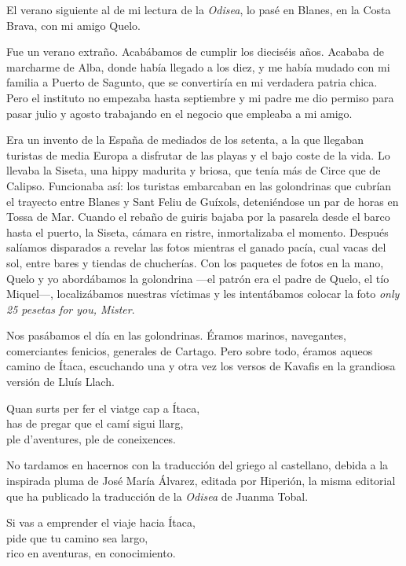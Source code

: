 \label{cap:marcharse}

El verano siguiente al de mi lectura de la \emph{Odisea}, lo pasé en Blanes, en la Costa Brava, con mi amigo Quelo.

Fue un verano extraño. Acabábamos de cumplir los dieciséis años. Acababa de marcharme de Alba, donde había llegado a los diez, y me había mudado con mi familia a Puerto de Sagunto, que se convertiría en mi verdadera patria chica. Pero el instituto no empezaba hasta septiembre y mi padre me dio permiso para pasar julio y agosto trabajando en el negocio que empleaba a mi amigo.

Era un invento de la España de mediados de los setenta, a la que llegaban turistas de media Europa a disfrutar de las playas y el bajo coste de la vida. Lo llevaba la Siseta, una hippy madurita y briosa, que tenía más de Circe que de Calipso. Funcionaba así: los turistas embarcaban en las golondrinas que cubrían el trayecto entre Blanes y Sant Feliu de Guíxols, deteniéndose un par de horas en Tossa de Mar. Cuando el rebaño de guiris bajaba por la pasarela desde el barco hasta el puerto, la Siseta, cámara en ristre, inmortalizaba el momento. Después salíamos disparados a revelar las fotos mientras el ganado pacía, cual vacas del sol, entre bares y tiendas de chucherías. Con los paquetes de fotos en la mano, Quelo y yo abordábamos la golondrina ---el patrón era el padre de Quelo, el tío Miquel---, localizábamos nuestras víctimas y les intentábamos colocar la foto \emph{only 25 pesetas for you, Mister}.

Nos pasábamos el día en las golondrinas. Éramos marinos, navegantes, comerciantes fenicios, generales de Cartago. Pero sobre todo, éramos aqueos camino de Ítaca, escuchando una y otra vez los versos de Kavafis en la grandiosa versión de Lluís Llach.

\begin{versocita}
Quan surts per fer el viatge cap a Ítaca,\\
has de pregar que el camí sigui llarg,\\
ple d'aventures, ple de coneixences.
\end{versocita}

No tardamos en hacernos con la traducción del griego al castellano, debida a la inspirada pluma de José María Álvarez, editada por Hiperión, la misma editorial que ha publicado la traducción de la \emph{Odisea} de Juanma Tobal.

\begin{versocita}
Si vas a emprender el viaje hacia Ítaca,\\
pide que tu camino sea largo,\\
rico en aventuras, en conocimiento.
\end{versocita}

